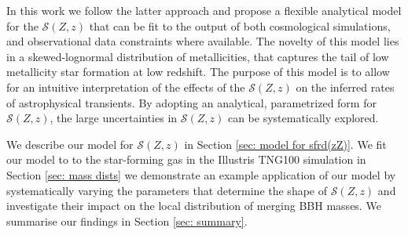 \documentclass[twocolumn]{aastex631}
\newcommand{\SFRDzZ}{\ensuremath{\mathcal{S}(Z,z)}\xspace}
\newcommand{\SFRDz}{\ensuremath{\mathrm{SFRD}(z)}\xspace}
\newcommand{\dpdZ}{\ensuremath{\mathrm{dP/dZ}(Z,z)}\xspace}
\begin{document}
In this work we follow the latter approach and propose a flexible analytical model for the \SFRDzZ that can be fit to the output of both cosmological simulations, and observational data constraints where available. The novelty of this model lies in a skewed-lognormal distribution of metallicities, that captures the tail of low metallicity star formation at low redshift. 
The purpose of this model is to allow for an intuitive interpretation of the effects of the \SFRDzZ on the inferred rates of astrophysical transients. By adopting an analytical, parametrized form for \SFRDzZ, the large uncertainties in \SFRDzZ can be systematically explored.%


We describe our model for \SFRDzZ in Section \ref{sec: model for sfrd(zZ)}.
We fit our model to to the star-forming gas in the Illustris TNG100 simulation in Section \ref{sec: mass dists} we demonstrate an example application of our model by systematically varying the parameters that determine the shape of \SFRDzZ and investigate their impact on the local distribution of merging BBH masses.
We summarise our findings in Section \ref{sec: summary}.


\end{document}
